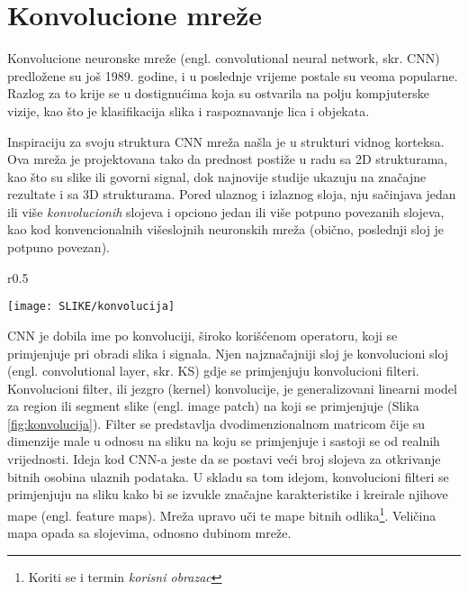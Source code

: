 \documentclass[12pt]{report}
\numberwithin{equation}{section}
\begin{document}
\newpage

\section{Konvolucione mreže}


Konvolucione neuronske mreže (engl. convolutional neural network, skr. CNN) predložene su još 1989. godine, i u poslednje vrijeme postale su veoma popularne. Razlog za to krije se u dostignućima koja su ostvarila na polju kompjuterske vizije, kao što je klasifikacija slika i raspoznavanje lica i objekata. 

  Inspiraciju za svoju struktura CNN mreža našla je u strukturi vidnog korteksa. Ova mreža je projektovana tako da prednost postiže u radu sa 2D strukturama, kao što su slike ili govorni signal, dok najnovije  studije  ukazuju na značajne rezultate i sa 3D strukturama.  Pored ulaznog i izlaznog sloja, nju sačinjava jedan ili više \textit{konvolucionih} slojeva i opciono jedan ili više potpuno povezanih slojeva,  kao kod konvencionalnih višeslojnih neuronskih  mreža (obično, poslednji sloj je potpuno povezan).  

   \begin{wrapfigure}{r}{0.5\textwidth}
\vspace{-20pt}  
  \begin{center}
    \texttt{[image: SLIKE/konvolucija]}
  \end{center}
  \vspace{-20pt}
  \caption{Primjer konvolucije: Na monohromatsku sliku se primjenjuje filter, pri čemu je korak $K=1$.}
  \label{fig:konvolucija}
  \vspace{-20pt}
\end{wrapfigure}

CNN je dobila  ime  po  konvoluciji,  široko  korišćenom operatoru, koji  se  primjenjuje  pri  obradi  slika  i  signala. Njen najznačajniji sloj je konvolucioni sloj (engl. convolutional layer, skr. KS) gdje se primjenjuju konvolucioni  filteri.   Konvolucioni  filter, ili jezgro (kernel) konvolucije, je  generalizovani linearni  model za region ili segment slike (engl. image patch)  na  koji se  primjenjuje (Slika \ref{fig:konvolucija}). Filter se predstavlja dvodimenzionalnom matricom čije su dimenzije male u odnosu na sliku na koju se primjenjuje i sastoji se od realnih vrijednosti. Ideja kod CNN-a jeste da  se postavi veći broj slojeva za otkrivanje bitnih  osobina ulaznih podataka.  U  skladu  sa  tom  idejom, konvolucioni  filteri se primjenjuju na sliku kako bi se izvukle značajne karakteristike i kreirale njihove mape  (engl. feature  maps). Mreža upravo uči te mape bitnih odlika\footnote{Koriti se i termin \textit{korisni obrazac}}. Veličina mapa opada sa slojevima, odnosno dubinom mreže. %
\end{document}
